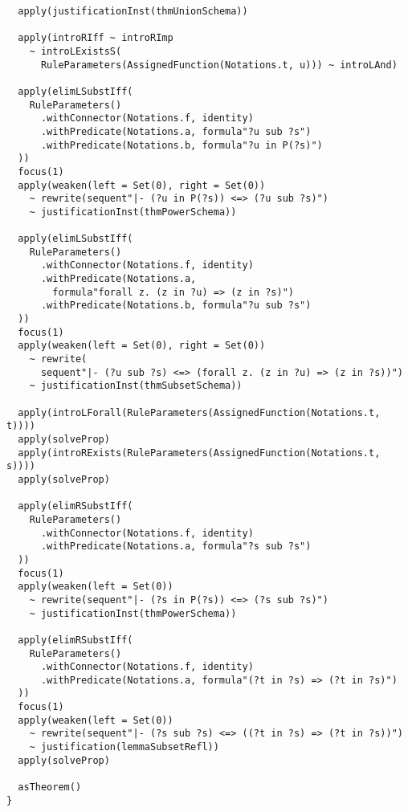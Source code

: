 \begin{lstlisting}
  apply(justificationInst(thmUnionSchema))

  apply(introRIff ~ introRImp
    ~ introLExistsS(
      RuleParameters(AssignedFunction(Notations.t, u))) ~ introLAnd)

  apply(elimLSubstIff(
    RuleParameters()
      .withConnector(Notations.f, identity)
      .withPredicate(Notations.a, formula"?u sub ?s")
      .withPredicate(Notations.b, formula"?u in P(?s)")
  ))
  focus(1)
  apply(weaken(left = Set(0), right = Set(0))
    ~ rewrite(sequent"|- (?u in P(?s)) <=> (?u sub ?s)")
    ~ justificationInst(thmPowerSchema))

  apply(elimLSubstIff(
    RuleParameters()
      .withConnector(Notations.f, identity)
      .withPredicate(Notations.a,
        formula"forall z. (z in ?u) => (z in ?s)")
      .withPredicate(Notations.b, formula"?u sub ?s")
  ))
  focus(1)
  apply(weaken(left = Set(0), right = Set(0))
    ~ rewrite(
      sequent"|- (?u sub ?s) <=> (forall z. (z in ?u) => (z in ?s))")
    ~ justificationInst(thmSubsetSchema))

  apply(introLForall(RuleParameters(AssignedFunction(Notations.t, t))))
  apply(solveProp)
  apply(introRExists(RuleParameters(AssignedFunction(Notations.t, s))))
  apply(solveProp)

  apply(elimRSubstIff(
    RuleParameters()
      .withConnector(Notations.f, identity)
      .withPredicate(Notations.a, formula"?s sub ?s")
  ))
  focus(1)
  apply(weaken(left = Set(0))
    ~ rewrite(sequent"|- (?s in P(?s)) <=> (?s sub ?s)")
    ~ justificationInst(thmPowerSchema))

  apply(elimRSubstIff(
    RuleParameters()
      .withConnector(Notations.f, identity)
      .withPredicate(Notations.a, formula"(?t in ?s) => (?t in ?s)")
  ))
  focus(1)
  apply(weaken(left = Set(0))
    ~ rewrite(sequent"|- (?s sub ?s) <=> ((?t in ?s) => (?t in ?s))")
    ~ justification(lemmaSubsetRefl))
  apply(solveProp)

  asTheorem()
}
\end{lstlisting}